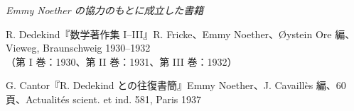 \clearpage
\begin{center}
\emph{Emmy Noether の協力のもとに成立した書籍}
\end{center}
\label{buecher-entstanden-unter-mitwirkung-von-emmy-noether}

\begingroup
\setlength{\parindent}{0pt}
\setlength{\parskip}{0.5em}
R. Dedekind『数学著作集 I--III』R. Fricke、Emmy Noether、Øystein Ore 編、Vieweg, Braunschweig 1930--1932\\
（第 I 巻：1930、第 II 巻：1931、第 III 巻：1932）\par
G. Cantor『R. Dedekind との往復書簡』Emmy Noether、J. Cavaillès 編、60 頁、Actualités scient. et ind. 581, Paris 1937\par
\endgroup

\endgroup
